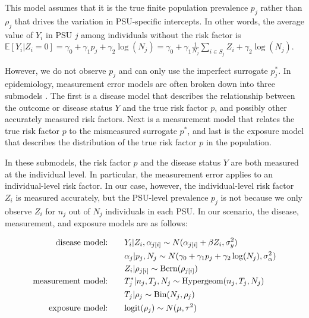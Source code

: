 \documentclass[10pt,a4paper]{article}
\newcommand*{\red}{\textcolor{red}}
\begin{document}
This model assumes that it is the true finite population prevalence $p_j$ rather than $\rho_j$ that drives the variation in PSU-specific intercepts. In other words, the average value of $Y_i$ in PSU $j$ among individuals without the risk factor is $\mathbb{E}[Y_i | Z_i = 0] = \gamma_0 + \gamma_1 p_j + \gamma_2 \log(N_j) = \gamma_0 + \gamma_1 \frac{1}{N_j} \sum_{i \in S_j} Z_i + \gamma_2 \log(N_j)$.



However, we do not observe $p_j$ and can only use the imperfect surrogate $p^*_j$. In epidemiology, measurement error models are often broken down into three submodels \citep{richardson_gilks}. The first is a disease model that describes the relationship between the outcome or disease status $Y$ and the true risk factor $p$, and possibly other accurately measured risk factors. Next is a measurement model that relates the true risk factor $p$ to the mismeasured surrogate $p^*$, and last is the exposure model that describes the distribution of the true risk factor $p$ in the population.

In these submodels, the risk factor $p$ and the disease status $Y$ are both measured at the individual level. In particular, the measurement error applies to an individual-level risk factor. In our case, however, the individual-level risk factor $Z_i$ is measured accurately, but the PSU-level prevalence $p_j$ is not because we only observe $Z_i$ for $n_j$ out of $N_j$ individuals in each PSU. In our scenario, the disease, measurement, and exposure models are as follows:

\begin{align}
	\textrm{disease model:} \quad \quad &Y_i | Z_i, \alpha_{j[i]} \sim N(\alpha_{j[i]} + \beta Z_i, \sigma_y^2) \label{disease} \\
	&\alpha_j | p_j, N_j \sim N(\gamma_0 + \gamma_1 p_j + \gamma_2 \log(N_j), \sigma_{\alpha}^2) \notag\\
	&Z_i | \rho_{j[i]} \sim \textrm{Bern}(\rho_{j[i]}) \notag\\
	\textrm{measurement model:}\quad \quad	&T^*_j | n_j, T_j, N_j \sim \textrm{Hypergeom}(n_j, T_j, N_j) \label{measurement} \\
	& T_j | \rho_j \sim \textrm{Bin}(N_j, \rho_j) \notag\\
	\textrm{exposure model:} \quad \quad &\textrm{logit}(\rho_j) \sim N(\mu, \tau^2) \label{exposure}
\end{align}
\end{document}
